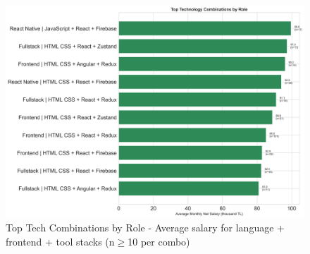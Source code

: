 \documentclass[12pt,a4paper]{article}
\begin{document}
\begin{figure}[H]
	\centering
	\includegraphics[width=\textwidth]{figures/barplot_tech_combinations_by_role.png}
	\caption{Top Tech Combinations by Role - Average salary for language + frontend + tool stacks (n$\geq$10 per combo)}
\end{figure}
\end{document}
